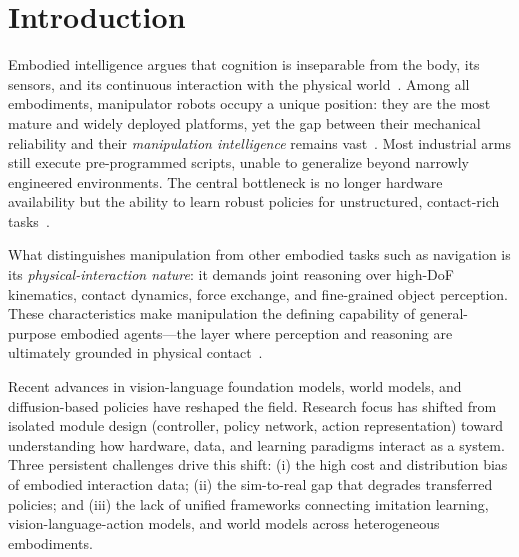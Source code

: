 \documentclass[acmsmall,screen,review,anonymous]{acmart}
\begin{document}
\section{Introduction}\label{sec:introduction}

Embodied intelligence argues that cognition is inseparable from the body, its sensors, and its continuous interaction with the physical world~\cite{brooksIntelligenceWithoutRepresentation1991, pfeiferHowBodyShapes2012, clarkBeingTherePutting1998}. Among all embodiments, manipulator robots occupy a unique position: they are the most mature and widely deployed platforms, yet the gap between their mechanical reliability and their \emph{manipulation intelligence} remains vast~\cite{sicilianoSpringerHandbookRobotics2016}. Most industrial arms still execute pre-programmed scripts, unable to generalize beyond narrowly engineered environments. The central bottleneck is no longer hardware availability but the ability to learn robust policies for unstructured, contact-rich tasks~\cite{levineLearningHandEyeCoordination2016, kalashnikovQTOptScalable2018}.

What distinguishes manipulation from other embodied tasks such as navigation is its \emph{physical-interaction nature}: it demands joint reasoning over high-DoF kinematics, contact dynamics, force exchange, and fine-grained object perception. These characteristics make manipulation the defining capability of general-purpose embodied agents---the layer where perception and reasoning are ultimately grounded in physical contact~\cite{khatibInertialPropertiesRobot1987, lakeBuildingMachinesThat2017}.

Recent advances in vision-language foundation models, world models, and diffusion-based policies have reshaped the field. Research focus has shifted from isolated module design (controller, policy network, action representation) toward understanding how hardware, data, and learning paradigms interact as a system. Three persistent challenges drive this shift: (i) the high cost and distribution bias of embodied interaction data; (ii) the sim-to-real gap that degrades transferred policies; and (iii) the lack of unified frameworks connecting imitation learning, vision-language-action models, and world models across heterogeneous embodiments.
\end{document}
